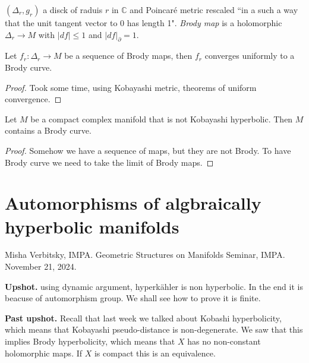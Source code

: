 \begin{definition}
\label{definition-bk-brody-map}
$(\Delta_r,g_r)$ a disck of raduis $r$ in
$\mathbb{C}$ and Poincaré metric rescaled
``in a such a way that the unit tangent
vector to 0 has length 1". {\it Brody map} is
a holomorphic $\Delta_r \to M$ with $|df|\leq
1$ and $|df|_\partial=1$.
\end{definition}

\begin{lemma}[Lemma 1]
\label{lemma-bk-uniform-convergence}
Let $f_r:\Delta_r \to M$ be a sequence of
Brody maps, then $f_r$ converges uniformly to
a Brody curve.
\end{lemma}

\begin{proof}
Took some time, using Kobayashi metric,
theorems of uniform convergence.
\end{proof}

\begin{theorem}
\label{theorem-bk-brody-lemma}
Let $M$ be a compact complex manifold that is
not Kobayashi hyperbolic. Then $M$ contains a
Brody curve.
\end{theorem}

\begin{proof}
Somehow we have a sequence of maps, but they
are not Brody. To have Brody curve we need to
take the limit of Brody maps.
\end{proof}

\section{Automorphisms of algbraically
hyperbolic manifolds}
\label{section-automorphisms-alg-hyperbolic}

\noindent
Misha Verbitsky, IMPA.
Geometric Structures on Manifolds Seminar,
IMPA.
November 21, 2024.

\medskip\noindent
{\bf Upshot.}
using dynamic argument, hyperkähler is non
hyperbolic. In the end it is beacuse of
automorphism group. We shall see how to prove
it is finite.

\medskip\noindent
{\bf Past upshot.}
Recall that last week we talked about Kobashi
hyperbolicity, which means that Kobayashi
pseudo-distance is non-degenerate. We saw
that this implies Brody hyperbolicity, which
means that $X$ has no non-constant
holomorphic maps. If $X$ is compact this is
an equivalence.

